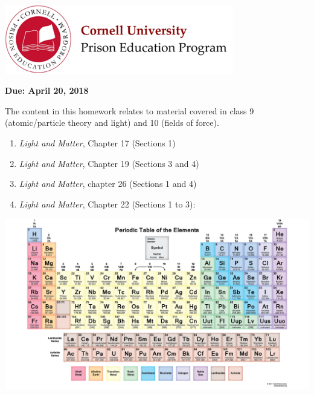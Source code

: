\documentclass[addpoints,12pt]{exam}
\begin{document}

\begin{flushright}
\vspace{0.2in}

\end{flushright}

\begin{center}
\includegraphics[width=10cm]{../images/logo.png}
\end{center}

\begin{center}
\end{center}


\noindent \noindent\begin{large}\textbf{Due: April 20, 2018}\end{large}
\vspace{0.2in}

The content in this homework relates to material covered in class 9 (atomic/particle theory and light) and 10 (fields of force).
\begin{enumerate}
	\item \textit{Light and Matter}, Chapter 17 (Sections 1)
	\item \textit{Light and Matter}, Chapter 19 (Sections 3 and 4)
	\item \textit{Light and Matter}, chapter 26 (Sections 1 and 4)
	\item \textit{Light and Matter}, Chapter 22 (Sections 1 to 3):
\end{enumerate}

\begin{center}
	\includegraphics[width=\textwidth]{../images/periodicTable.png}
\end{center}
 
\end{document}
